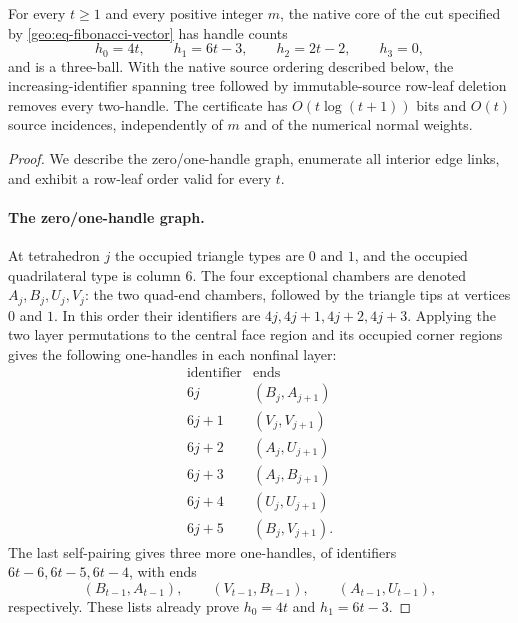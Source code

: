 \begin{theorem}
\label{geo:thm-fibonacci}
For every $t\ge1$ and every positive integer $m$, the native core of the
cut specified by \eqref{geo:eq-fibonacci-vector} has handle counts
\[
 h_0=4t,\qquad h_1=6t-3,\qquad h_2=2t-2,\qquad h_3=0,
 \tag{G12}\label{geo:eq-fibonacci-counts}
\]
and is a three-ball.  With the native source ordering described below,
the increasing-identifier spanning tree followed by immutable-source
row-leaf deletion removes every two-handle.  The certificate has
$O(t\log(t+1))$ bits and $O(t)$ source incidences, independently of $m$ and
of the numerical normal weights.
\end{theorem}

\begin{proof}
We describe the zero/one-handle graph, enumerate all interior edge links,
and exhibit a row-leaf order valid for every $t$.

\paragraph{The zero/one-handle graph.}
At tetrahedron $j$ the occupied triangle types are $0$ and $1$, and the
occupied quadrilateral type is column $6$.  The four exceptional chambers
are denoted $A_j,B_j,U_j,V_j$: the two quad-end chambers, followed by the
triangle tips at vertices $0$ and $1$.  In this order their identifiers are
$4j,4j+1,4j+2,4j+3$.  Applying the two layer permutations to the central
face region and its occupied corner regions gives the following
one-handles in each nonfinal layer:
\[
\begin{array}{c|c}
\text{identifier}&\text{ends}\\ \hline
6j   &(B_j,A_{j+1})\\
6j+1 &(V_j,V_{j+1})\\
6j+2 &(A_j,U_{j+1})\\
6j+3 &(A_j,B_{j+1})\\
6j+4 &(U_j,U_{j+1})\\
6j+5 &(B_j,V_{j+1}).
\end{array}
 \tag{G13}\label{geo:eq-fibonacci-graph}
\]
The last self-pairing gives three more one-handles, of identifiers
$6t-6,6t-5,6t-4$, with ends
\[
 (B_{t-1},A_{t-1}),\qquad
 (V_{t-1},B_{t-1}),\qquad
 (A_{t-1},U_{t-1}),
\]
respectively.  These lists already prove $h_0=4t$ and $h_1=6t-3$.


\end{proof}

